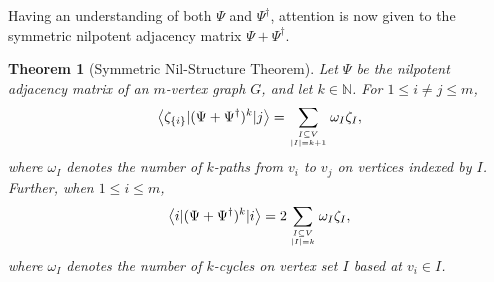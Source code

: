 \documentclass{article}
\newtheorem{theorem}{Theorem}[section]
\theoremstyle{definition}
\numberwithin{equation}{section}
\begin{document}
Having an understanding of both $\Psi$ and $\Psi^\dag$, attention is now given to the symmetric nilpotent adjacency matrix $\Psi+\Psi^\dag$.

\begin{theorem}[Symmetric Nil-Structure Theorem]
Let $\Psi$ be the nilpotent adjacency matrix of an
$m$-vertex graph $G$, and let $k\in\mathbb{N}$.  For $1\le i\ne j \le m$, 
\begin{equation*}
\left<\zeta_{\{i\}}\vert(\Psi+\Psi^\dag)^k\vert j\right>=
\sum_{\genfrac{}{}{0pt}{}{I\subseteq V}{|I|=k+1}}\omega_I \zeta_{I},\end{equation*}
where $\omega_I$ denotes the number of $k$-paths from $v_i$ to $v_j$ on vertices indexed by $I$.  Further,  when $1\le i \le m$,
\begin{equation*}
\left<i\vert(\Psi+\Psi^\dag)^k\vert i\right>=2\sum_{\genfrac{}{}{0pt}{}{I\subseteq V}{|I|=k}}\omega_I \zeta_{I},\end{equation*}
where $\omega_I$ denotes the number of $k$-cycles on vertex set $I$ based at $v_i\in I$.  
\end{theorem}
\end{document}
